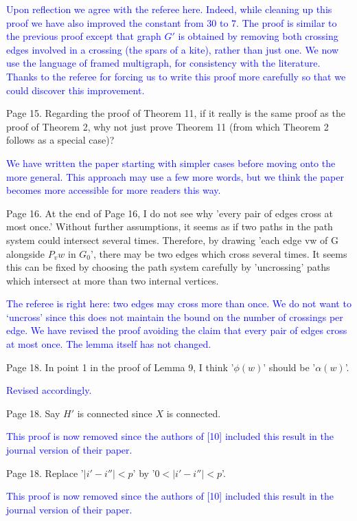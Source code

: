 \documentclass[12pt]{article}
\newcommand{\changed}{\textcolor{blue}{Revised accordingly.}}
\begin{document}
\textcolor{blue}{Upon reflection we agree with the referee here. Indeed, while cleaning up this proof we have also improved the constant from $30$ to $7$. The proof is similar to the previous proof except that graph $G'$ is obtained by removing both crossing edges involved in a crossing (the spars of a kite), rather than just one.  We now use the language of framed multigraph, for consistency with the literature. Thanks to the referee for forcing us to write this proof more carefully so that we could discover this improvement.}

Page 15. Regarding the proof of Theorem 11, if it really is the same
proof as the proof of Theorem 2, why not just prove Theorem 11 (from
which Theorem 2 follows as a special case)?

\textcolor{blue}{We have written the paper starting with simpler cases before moving onto the more general. This approach may use a few more words, but we think the paper becomes more accessible for more readers this way.}

Page 16.  At the end of Page 16, I do not see why 'every pair of edges
cross at most once.'  Without further assumptions, it seems as if two
paths in the path system could intersect several times.  Therefore, by
drawing 'each edge vw of G alongside $P_vw$ in $G_0$', there may be two
edges which cross several times.  It seems this can be fixed by
choosing the path system carefully by 'uncrossing' paths which
intersect at more than two internal vertices.

\textcolor{blue}{The referee is right here: two edges may cross more than once. We do not want to `uncross' since this does not maintain the bound on the number of crossings per edge. We have revised the proof avoiding the claim that every pair of edges cross at most once. The lemma itself has not changed.}

Page 18. In point 1 in the proof of Lemma 9, I think '$\phi(w)$' should
be '$\alpha(w)$'.

\changed

Page 18.  Say $H'$ is connected since $X$ is connected.

\textcolor{blue}{This proof is now removed since the authors of [10] included this result in the journal version of their paper.}

Page 18.  Replace '$|i'-i''| < p$' by  '$0< |i'-i''| < p$'.

\textcolor{blue}{This proof is now removed since the authors of [10] included this result in the journal version of their paper.}
\end{document}
